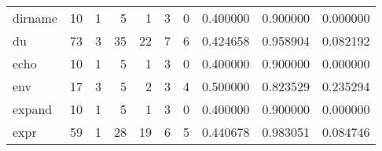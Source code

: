 \begin{tabular}{lrrrrrrrrr}
dirname   &                                       10 &                                                  1 &                                                  5 &                                                  1 &                                                  3 &                                                  0 &                                           0.400000 &                               0.900000 &                             0.000000 \\
du        &                                       73 &                                                  3 &                                                 35 &                                                 22 &                                                  7 &                                                  6 &                                           0.424658 &                               0.958904 &                             0.082192 \\
echo      &                                       10 &                                                  1 &                                                  5 &                                                  1 &                                                  3 &                                                  0 &                                           0.400000 &                               0.900000 &                             0.000000 \\
env       &                                       17 &                                                  3 &                                                  5 &                                                  2 &                                                  3 &                                                  4 &                                           0.500000 &                               0.823529 &                             0.235294 \\
expand    &                                       10 &                                                  1 &                                                  5 &                                                  1 &                                                  3 &                                                  0 &                                           0.400000 &                               0.900000 &                             0.000000 \\
expr      &                                       59 &                                                  1 &                                                 28 &                                                 19 &                                                  6 &                                                  5 &                                           0.440678 &                               0.983051 &                             0.084746 \\

\end{tabular}
